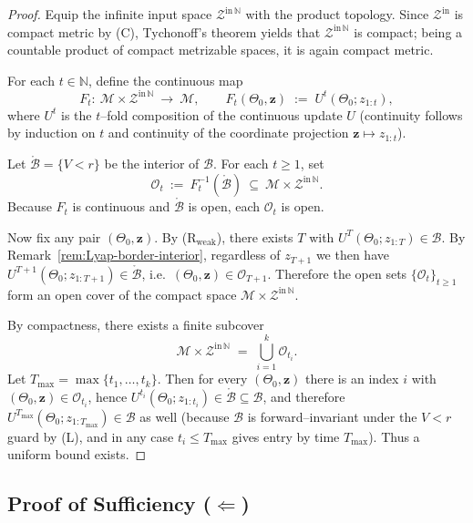 \documentclass[12pt]{article}
\theoremstyle{definition}
\theoremstyle{plain}
\begin{document}
\begin{proof}
Equip the infinite input space $\mathcal Z^{\mathrm{in}\,\mathbb N}$ with the product topology.
Since $\mathcal Z^{\mathrm{in}}$ is compact metric by (C), Tychonoff’s theorem yields that
$\mathcal Z^{\mathrm{in}\,\mathbb N}$ is compact; being a countable product of compact metrizable spaces, it is again compact metric.

For each $t\in\mathbb N$, define the continuous map
\[
F_t:\ \mathcal M\times \mathcal Z^{\mathrm{in}\,\mathbb N}\ \longrightarrow\ \mathcal M,
\qquad
F_t(\Theta_0,\mathbf z)\;:=\;U^t(\Theta_0;z_{1:t}),
\]
where $U^t$ is the $t$–fold composition of the continuous update $U$ (continuity follows by induction on $t$ and continuity of the coordinate projection $\mathbf z\mapsto z_{1:t}$).

Let $\mathring{\mathcal B}=\{V<r\}$ be the interior of $\mathcal B$.
For each $t\ge1$, set
\[
\mathcal O_t\ :=\ F_t^{-1}(\mathring{\mathcal B})
\ \subseteq\ \mathcal M\times \mathcal Z^{\mathrm{in}\,\mathbb N}.
\]
Because $F_t$ is continuous and $\mathring{\mathcal B}$ is open, each $\mathcal O_t$ is open.

Now fix any pair $(\Theta_0,\mathbf z)$. By (R$_{\mathrm{weak}}$), there exists $T$ with
$U^T(\Theta_0;z_{1:T})\in\mathcal B$. By Remark~\ref{rem:Lyap-border-interior}, regardless of $z_{T+1}$ we then have
$U^{T+1}(\Theta_0;z_{1:T+1})\in\mathring{\mathcal B}$, i.e.\ $(\Theta_0,\mathbf z)\in\mathcal O_{T+1}$.
Therefore the open sets $\{\mathcal O_t\}_{t\ge1}$ form an open cover of the compact space
$\mathcal M\times \mathcal Z^{\mathrm{in}\,\mathbb N}$.

By compactness, there exists a finite subcover
\[
\mathcal M\times \mathcal Z^{\mathrm{in}\,\mathbb N}\;=\;\bigcup_{i=1}^k \mathcal O_{t_i}.
\]
Let $T_{\max}=\max\{t_1,\dots,t_k\}$. Then for every $(\Theta_0,\mathbf z)$ there is an index $i$ with
$(\Theta_0,\mathbf z)\in\mathcal O_{t_i}$, hence
$U^{t_i}(\Theta_0;z_{1:t_i})\in\mathring{\mathcal B}\subseteq\mathcal B$, and therefore
$U^{T_{\max}}(\Theta_0;z_{1:T_{\max}})\in\mathcal B$ as well (because $\mathcal B$ is forward–invariant under the $V<r$ guard by (L), and in any case $t_i\le T_{\max}$ gives entry by time $T_{\max}$).
Thus a uniform bound exists.
\end{proof}

\subsection{Proof of Sufficiency ($\Leftarrow$)}
\end{document}
